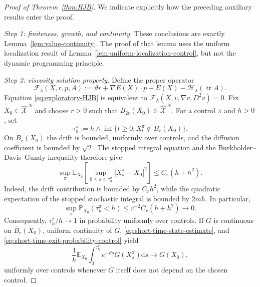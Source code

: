 \documentclass[10pt,a4paper]{amsart}
\def\E{\mathbb{E}}
\def\Fc{{\mathcal F}}
\def\P{\mathbb{P}}
\def\Xc{{\mathcal X}}
\newcommand{\dd}{\mathrm{d}}
\def\hX{\widehat{\Xc}^{\,N}}
\newcommand{\tr}{\operatorname{tr}}
\begin{document}
\begin{proof}[Proof of Theorem~\ref{thm:HJB}]
We indicate explicitly how the preceding auxiliary results enter the proof.

\medskip
\noindent\textit{Step 1: finiteness, growth, and continuity.}
These conclusions are exactly Lemma~\ref{lem:value-continuity}.  The proof of that lemma uses the
uniform localization result of Lemma~\ref{lem:uniform-localization-control}, but not the dynamic
programming principle.

\medskip
\noindent\textit{Step 2: viscosity solution property.}
Define the proper operator
\begin{equation}\label{eq:proper-HJB-operator}
 \Fc_\lambda(X,r,p,A)
 :=\vartheta r+\nabla E(X)\cdot p-E(X)
 -\mathscr H_\lambda(\tr A).
\end{equation}
Equation \eqref{eq:exploratory-HJB} is equivalent to
$\Fc_\lambda(X,v,\nabla v,D^2v)=0$.
Fix $X_0\in\hX$ and choose $r>0$ such that
$\overline B_{2r}(X_0)\Subset\hX$.  For a control $\pi$ and $h>0$, set
\begin{equation}\label{eq:viscosity-exit-time-control}
 \tau_h^\pi
 :=h\wedge\inf\{t\ge0:X_t^\pi\notin B_r(X_0)\}.
\end{equation}
On $B_r(X_0)$ the drift is bounded, uniformly over controls, and the diffusion coefficient is
bounded by $\sqrt2$.  The stopped integral equation and the Burkholder--Davis--Gundy inequality
therefore give
\begin{equation}\label{eq:short-time-state-estimate}
 \sup_\pi\E_{X_0}\left[
 \sup_{0\le s\le\tau_h^\pi}|X_s^\pi-X_0|^2\right]
 \le C_r(h+h^2).
\end{equation}
Indeed, the drift contribution is bounded by $C_rh^2$, while the quadratic expectation of the
stopped stochastic integral is bounded by $2mh$.  In particular,
\begin{equation}\label{eq:short-time-exit-probability-control}
 \sup_\pi\P_{X_0}(\tau_h^\pi<h)
 \le r^{-2}C_r(h+h^2)\longrightarrow0.
\end{equation}
Consequently, $\tau_h^\pi/h\to1$ in probability uniformly over controls.  If $G$ is continuous on
$\overline B_r(X_0)$, uniform continuity of $G$, \eqref{eq:short-time-state-estimate}, and
\eqref{eq:short-time-exit-probability-control} yield
\begin{equation}\label{eq:short-time-average-control}
 \frac1h\E_{X_0}\int_0^{\tau_h^\pi}e^{-\vartheta s}G(X_s^\pi)\dd s
 \longrightarrow G(X_0),
\end{equation}
uniformly over controls whenever $G$ itself does not depend on the chosen control.

\end{proof}
\end{document}
